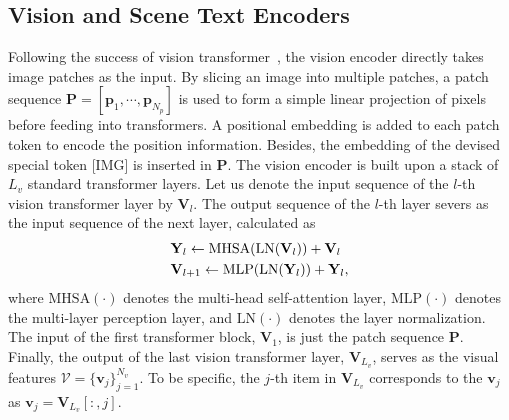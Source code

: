 \documentclass[10pt,twocolumn,letterpaper]{article}
\begin{document}
\noindent\subsection{Vision and Scene Text Encoders}
\label{Vision Encoder}
Following the success of vision transformer~\cite{ViT}, the vision encoder directly takes image patches as the input. By slicing an image into multiple patches, a patch sequence $\mathbf{P} = [\mathbf{p}_1,\cdots, \mathbf{p}_{N_p}]$ is used to form a simple linear projection of pixels before  feeding into transformers. A positional embedding is added to each patch token to encode the position information. Besides, the embedding of the devised special token \textup{[IMG]} is inserted in $\mathbf{P}$. The vision encoder is built upon a stack of $L_v$ standard transformer layers. Let us denote the input sequence of the $l$-th vision transformer layer by $\mathbf{V}_l$. The output sequence of the $l$-th layer severs as the input sequence of the next layer, calculated as
\begin{equation}
\begin{split}
\label{equ_workflow}\vspace{-0.5em}
    &\mathbf{Y}_l \gets  \mathrm{MHSA}(\mathrm{LN}(\mathbf{V}_l)) + \mathbf{V}_l\\
     &\mathbf{V}_{l+1} \gets \mathrm{MLP}(\mathrm{LN}(\mathbf{Y}_l)) + \mathbf{Y}_l,\\
\end{split}
\end{equation}
where $\mathrm{MHSA}(\cdot)$ denotes the multi-head self-attention layer,  $\mathrm{MLP}(\cdot)$ denotes the multi-layer perception layer, and $\mathrm{LN}(\cdot)$ denotes the layer normalization. The input of the first transformer block, $\mathbf{V}_1$, is just the patch sequence $\mathbf{P}$.  Finally, the output of the last vision transformer layer, $\mathbf{V}_{L_v}$, serves as the visual features $\mathcal{V} = \{\mathbf{v}_j\}_{j=1}^{N_v}$. 
To be specific, the $j$-th item in $\mathbf{V}_{L_v}$ corresponds to the $\mathbf{v}_j$ as $ \mathbf{v}_j = \mathbf{V}_{L_v}[:,j]$.
\end{document}
